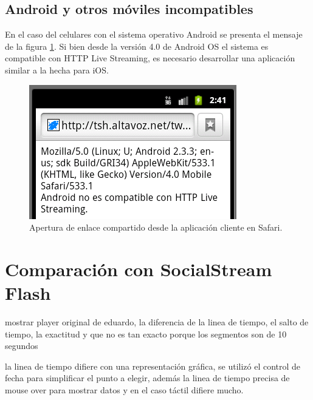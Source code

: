   \subsection{Android y otros móviles incompatibles}
  En el caso del celulares con el sistema operativo Android se presenta el mensaje de la figura \ref{fig:uagent-android}. Si bien desde la versión 4.0 de Android OS el sistema es compatible con HTTP Live Streaming, es necesario desarrollar una aplicación similar a la hecha para iOS.
    \begin{figure}[H]
	\centering
	\includegraphics[scale=0.7]{imgs/uagent-android.png} 
	\caption{Apertura de enlace compartido desde la aplicación cliente en Safari.}
	\label{fig:uagent-android}
\end{figure}  


\section{Comparación con SocialStream Flash}
mostrar player original de eduardo, la diferencia de la linea de tiempo, el salto de tiempo, la exactitud y que no es tan exacto porque los segmentos son de 10 segundos

la linea de tiempo difiere con una representación gráfica, se utilizó el control de fecha para simplificar el punto a elegir, además la linea de tiempo precisa de mouse over para mostrar datos y en el caso táctil difiere mucho.


